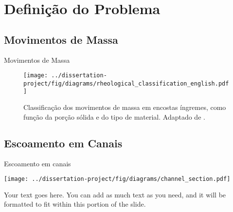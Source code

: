 \section{Definição do Problema}

\subsection{Movimentos de Massa}

\begin{frame}{Movimentos de Massa}
    \begin{figure}
        \centering
        \texttt{[image: ../dissertation-project/fig/diagrams/rheological\_classification\_english.pdf]}
        \caption{Classificação dos movimentos de massa em encostas íngremes, como função
        da porção sólida e do tipo de material. Adaptado de \cite{coussot_recognition_1996}.}
    \end{figure}
\end{frame}


\subsection{Escoamento em Canais}

\begin{frame}{Escoamento em canais}
    
    \begin{minipage}[c]{0.60\textwidth}
        \centering
        \texttt{[image: ../dissertation-project/fig/diagrams/channel\_section.pdf]}
    \end{minipage}
    \hfill
    \begin{minipage}[c]{0.36\textwidth}
        Your text goes here. You can add as much text as you need, and it will be formatted to fit within this portion of the slide.
    \end{minipage}
    
    \end{frame}